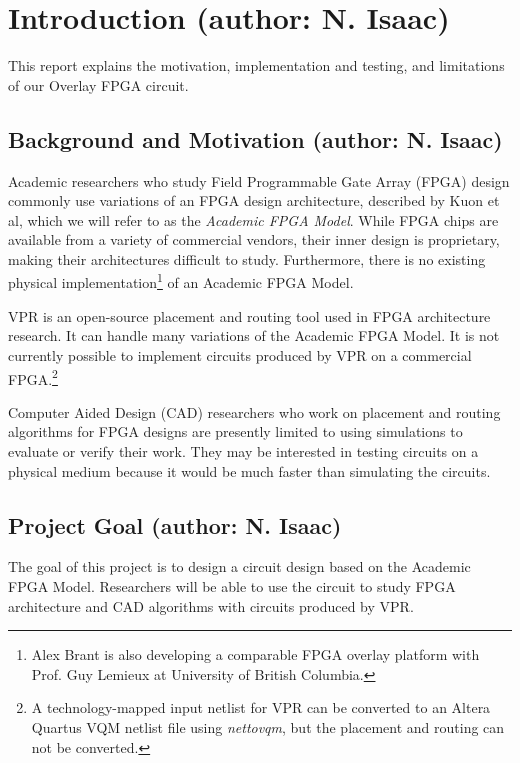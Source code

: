 \section{Introduction (author: N. Isaac)}

This report explains the motivation, implementation and testing, and limitations of our Overlay FPGA circuit.


\subsection{Background and Motivation (author: N. Isaac)}

Academic researchers who study Field Programmable Gate Array (FPGA) design commonly use variations of an FPGA design architecture, described by Kuon et al\cite{fpga}, which we will refer to as the \emph{Academic FPGA Model}.
While FPGA chips are available from a variety of commercial vendors, their inner design is proprietary, making their architectures difficult to study.
Furthermore, there is no existing physical implementation\footnote{Alex Brant is also developing a comparable FPGA overlay platform with Prof. Guy Lemieux at University of British Columbia.} of an Academic FPGA Model.

VPR\cite{vpr} is an open-source placement and routing tool used in FPGA architecture research.
It can handle many variations of the Academic FPGA Model.
It is not currently possible to implement circuits produced by VPR on a commercial FPGA.\footnote{A technology-mapped input netlist for VPR can be converted to an Altera Quartus VQM netlist file using \emph{nettovqm}\cite{nettovqm}, but the placement and routing can not be converted.}

Computer Aided Design (CAD) researchers who work on placement and routing algorithms for FPGA designs are presently limited to using simulations to evaluate or verify their work.
They may be interested in testing circuits on a physical medium because it would be much faster than simulating the circuits.



\subsection{Project Goal (author: N. Isaac)}

The goal of this project is to design a circuit design based on the Academic FPGA Model.
Researchers will be able to use the circuit to study FPGA architecture and CAD algorithms with circuits produced by VPR.


